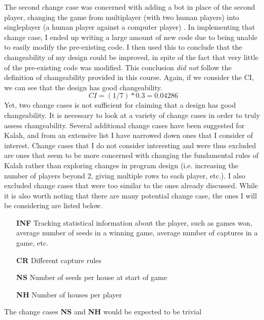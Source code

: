 \documentclass[10pt, a4paper, conference]{IEEEtran}
\begin{document}
The second change case was concerned with adding a bot in place of the second
player, changing the game from multiplayer (with two human players) into
singleplayer (a human player against a computer player) \cite{a5-change-case}.
In implementing that change case, I ended up writing a large amount of new code
due to being unable to easily modify the pre-existing code. I then used this to
conclude that the changeability of my design could be improved, in spite of the
fact that very little of the pre-existing code was modified. This conclusion
\textit{did not} follow the definition of changeability provided in this
course. Again, if we consider the CI, we can see that the design has good
changeability.
\begin{equation}
  CI = (1 / 7) * 0.3 = 0.04286
\end{equation}
Yet, two change cases is not sufficient for claiming that a design has good
changeability. It is necessary to look at a variety of change cases in order to
truly assess changeability. Several additional change cases have been suggested
for Kalah, and from an extensive list I have narrowed down ones that
I consider of interest. Change cases that I do not consider interesting
and were thus excluded are ones that seem to be more concerned with changing
the fundamental rules of Kalah rather than exploring changes in program design
(i.e. increasing the number of players beyond 2, giving multiple rows to each
player, etc.). I also excluded change cases that were too similar to the ones
already discussed. While it is also worth noting that there are many potential
change case, the ones I will be considering are listed below.\newline
\begin{itemize}
  \item[\textbf{INF}] Tracking statistical information about the player, such
    as games won, average number of seeds in a winning game, average number of
    captures in a game, etc.
  \item[\textbf{CR}] Different capture rules
  \item[\textbf{NS}] Number of seeds per house at start of game
  \item[\textbf{NH}] Number of houses per player
\end{itemize}
The change cases \textbf{NS} and \textbf{NH} would be expected to be trivial
\end{document}
